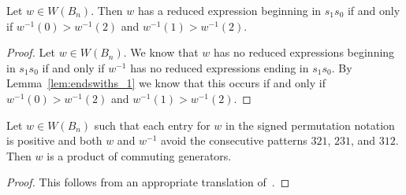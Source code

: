 \begin{corollary}\label{lem:beginswiths1}
	Let $w \in W(B_n)$. Then $w$ has a reduced expression beginning in $s_1s_0$ if and only if $w^{-1}(0)>w^{-1}(2)$ and $w^{-1}(1)>w^{-1}(2)$.
	\begin{proof}
		Let $w \in W(B_n)$. We know that $w$ has no reduced expressions beginning in $s_1s_0$ if and only if $w^{-1}$ has no reduced expressions ending in $s_1s_0$. By Lemma~\ref{lem:endswiths_1} we know that this occurs if and only if $w^{-1}(0)>w^{-1}(2)$ and $w^{-1}(1)>w^{-1}(2)$.
	\end{proof}
\end{corollary}

\begin{lemma}\label{lem:prodofcommA}
Let $w \in W(B_n)$ such that each entry for $w$ in the signed permutation notation is positive and both $w$ and $w^{-1}$ avoid the consecutive patterns $321$, $231$, and $312$. Then $w$ is a product of commuting generators.
\begin{proof}
	This follows from an appropriate translation of~\cite[Lemma 2.2.9]{Gern2013a}.
\end{proof}	
\end{lemma}

